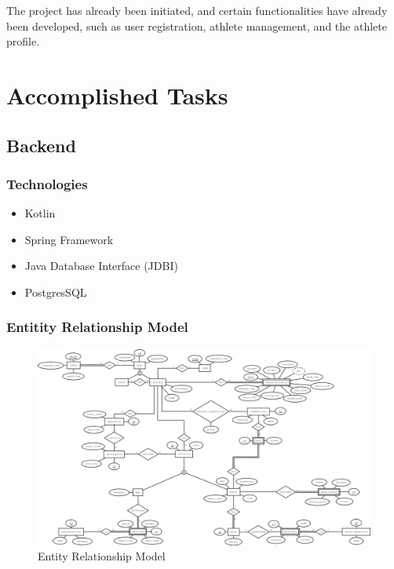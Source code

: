 \documentclass[a4paper,twoside,11pt]{article}
\begin{document}
The project has already been initiated, and certain functionalities have already been developed, such as user registration, athlete management, and the athlete profile.

\section{Accomplished Tasks}


\subsection{Backend}

\subsubsection{Technologies}
\begin{itemize}
\item Kotlin
\item Spring Framework
\item Java Database Interface (JDBI)
\item PostgresSQL
\end{itemize}

\subsubsection{Entitity Relationship Model}

\begin{figure}[H]
\centering
\includegraphics[width=6in]{EA.png}
\caption{Entity Relationship Model}
\end{figure}
\end{document}
